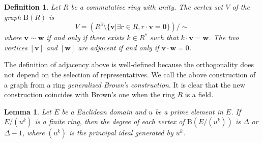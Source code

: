 \documentclass{article}
\newtheorem{Def}{Definition}
\newtheorem{Lem}{Lemma}
\newtheorem{Cor}[Lem]{Corollary}
\newcommand{\B}{\mathrm{B}}
\begin{document}
\begin{Def}
Let $R$ be a commutative ring with unity. The vertex set $V$ of the graph $\B(R)$ is 
\[ V = ( R^3 \setminus \{\bm v | \exists r \in R, r \cdot {\bm v} = {\bm 0} \} ) / \sim\]
where $\bm v \sim \bm w$ if and only if there exists $k \in R^*$ such that $k \cdot {\bm v} = {\bm w}$. The two vertices $[\bm v]$ and $[\bm w]$ are adjacent if and only if ${\bm v} \cdot {\bm w} = 0$.
\end{Def}

The definition of adjacency above is well-defined because the orthogonality does not depend on the selection of representatives. We call the above construction of a graph from a ring {\it generalized Brown's construction}. It is clear that the new construction coincides with Brown's one when the ring $R$ is a field. 

\iffalse

\begin{Lem}
Let $R_1, R_2$ be commutative rings with unit. 
\[ \B(R_1 \times R_2) \simeq \B(R_1) \otimes \B(R_2) \]
\end{Lem}

\begin{Cor}
The following equations hold.
\begin{enumerate}
\item $ | \B(R_1 \times R_2) | = | \B(R_1) | \times | \B(R_2) | $
\item $ \Delta(\B(R_1 \times R_2)) = \Delta(\B(R_1)) \times \Delta( \B(R_2) )$
\end{enumerate}
\end{Cor}

\fi 

\begin{Lem}\label{Lem:regular}
Let $E$ be a Euclidean domain and $u$ be a prime element in $E$. 
If $E/(u^k)$ is a finite ring, then the degree of each vertex of $\B(E/(u^k))$ is $\Delta$ or $\Delta-1$, 
where $(u^k)$ is the principal ideal generated by $u^k$. 
\end{Lem}
\end{document}
